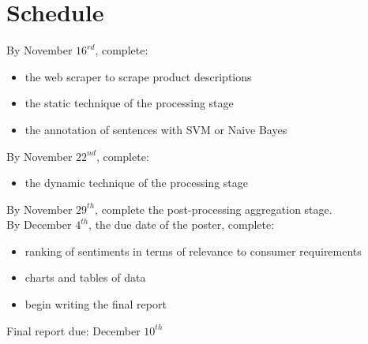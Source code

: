 \documentclass{article}
\begin{document}
\section{Schedule}

By November $16^{rd}$, complete:
\begin{itemize}
\item the web scraper to scrape product descriptions
\item the static technique of the processing stage 
\item the annotation of sentences with SVM or Naive Bayes 
\end{itemize}
By November $22^{nd}$, complete:
\begin{itemize}
\item the dynamic technique of the processing stage
\end{itemize}
By November $29^{th}$, complete the post-processing aggregation stage.
\newline \\
By December $4^{th}$, the due date of the poster, complete:
\begin{itemize}
\item 
ranking of sentiments in terms of relevance to consumer requirements 
\item charts and tables of data
\item begin writing the final report 
\end{itemize}

Final report due: December $10^{th}$
\end{document}
